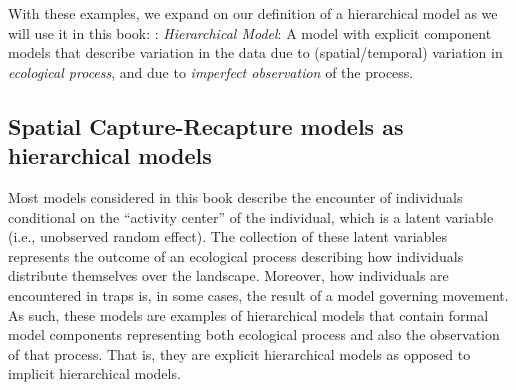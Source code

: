 With these examples,
we expand on our definition of a hierarchical model as we will use it
in this book: \newline
{: {\it Hierarchical Model}: A model with
  explicit component models that describe variation in the data due to
  (spatial/temporal) variation in {\it ecological process}, and due to
  {\it imperfect observation} of the process.
}





\subsection{Spatial Capture-Recapture models as hierarchical models}

Most models considered in this book describe the encounter of
individuals conditional on the ``activity center'' of the individual,
which is a latent variable (i.e., unobserved random effect).  The
collection of these latent variables represents the outcome of an
ecological process describing how individuals distribute themselves
over the landscape. Moreover, how individuals are encountered in traps
is, in some cases, the result of a model governing movement.  As such,
these models are examples of hierarchical models that contain formal
model components representing both ecological process and also the
observation of that process. That is, they are explicit hierarchical
models \citep{royle_dorazio:2008} as opposed to implicit hierarchical
models.




